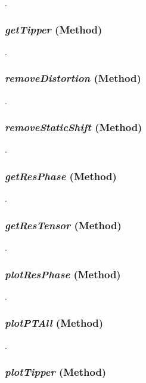 .

\subsubsection{\textit{getTipper} (Method)}
\label{sssec:core.z.Z.getTipper}

.

\subsubsection{\textit{removeDistortion} (Method)}
\label{sssec:core.z.Z.removeDistortion}

.

\subsubsection{\textit{removeStaticShift} (Method)}
\label{sssec:core.z.Z.removeStaticShift}

.

\subsubsection{\textit{getResPhase} (Method)}
\label{sssec:core.z.Z.getResPhase}

.

\subsubsection{\textit{getResTensor} (Method)}
\label{sssec:core.z.Z.getResTensor}

.

\subsubsection{\textit{plotResPhase} (Method)}
\label{sssec:core.z.Z.plotResPhase}

.

\subsubsection{\textit{plotPTAll} (Method)}
\label{sssec:core.z.Z.plotPTAll}

.

\subsubsection{\textit{plotTipper} (Method)}
\label{sssec:core.z.Z.plotTipper}

